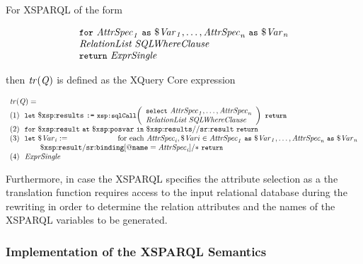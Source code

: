 For XSPARQL  of the form
%
\begin{queryF}
  \[
  \begin{array}{l}%
    \FOR~\envElem{AttrSpec}{1}~\keyword{as}~\envElem{\var{Var}}{1}, \dots, \envElem{AttrSpec}{n}~\keyword{as}~\envElem{\var{Var}}{n}\\
    \grammarRule{RelationList}~\grammarRule{SQLWhereClause}\\
    \ReturnExpr
  \end{array} 
  \]
  \label{eq:expr_tr_sql}
\end{queryF}%
%
\noindent
then $\mathit{tr}\!\left(\mathit{{Q}_{}}\right)$ is defined as the XQuery Core expression
%
\begin{small}
\begin{equation*}
  \begin{array}{l}
    \funcCall{tr}{\envElem{Q}{}} =  \\
    \mathrm{(1)~~}\LET~\varR{results}~\text{\texttt{:=}}~\funcCallR{sqlCall}{\begin{array}{l}
        \SELECT~\envElem{AttrSpec}{1}, \dots, \envElem{AttrSpec}{n}\\
        \grammarRule{RelationList}~\grammarRule{SQLWhereClause}
      \end{array}
    }~\RETURN\\
    \mathrm{(2)~~}\FOR~\varR{result}~\AT~\varR{posvar}~\IN~\varR{results//sr{:}result}~\RETURN \\
    \mathrm{(3)~~}\LET~\envElem{\var{Var}}{i} := \hfill \qquad\qquad\qquad \textrm{ for each } \envElem{AttrSpec}{i}, \var{Var}{i} \in \envElem{AttrSpec}{1}~\keyword{as}~\envElem{\var{Var}}{1}, \dots, \envElem{AttrSpec}{n}~\keyword{as}~\envElem{\var{Var}}{n}\\ 
    \qquad\qquad \varR{result/sr{:}binding[@name = \envElem{AttrSpec}{i}]/*}~\RETURN \\
    \mathrm{(4)~~}\grammarRule{ExprSingle} 
  \end{array}
\end{equation*}
\end{small}%
%
Furthermore, in case the XSPARQL specifies the attribute selection as a  the translation function requires
access to the input relational database during the rewriting in order to determine the relation attributes and the names
of the XSPARQL variables to be generated.


\subsubsection*{Implementation of the XSPARQL Semantics}
\label{sec:impl-xsparql-semant}

